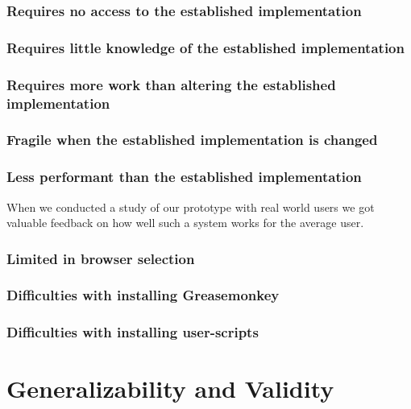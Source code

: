 \subsubsection{Requires no access to the established implementation}

\subsubsection{Requires little knowledge of the established implementation}

\subsubsection{Requires more work than altering the established
  implementation}

\subsubsection{Fragile when the established implementation is changed}

\subsubsection{Less performant than the established implementation}

\parabreak

When we conducted a study of our prototype with real world users
we got valuable feedback on how well such a system works for the average user.

\subsubsection{Limited in browser selection}

\subsubsection{Difficulties with installing Greasemonkey}

\subsubsection{Difficulties with installing user-scripts}

\section{Generalizability and Validity}
